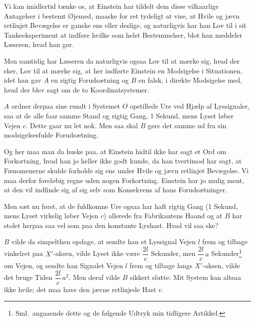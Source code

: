 \documentclass[12pt,a4paper]{article}
\newcommand{\opage}[1]{\marginnote{\footnotesize\textit{[#1]}}}
\begin{document}
Vi kan imidlertid tænke os, at Einstein har tildelt dem disse vilkaarlige
Antagelser i bestemt Øjemed, maaske for ret tydeligt at vise, at Hvile og jævn
retlinjet Bevægelse er ganske ens eller deslige, og naturligvis har han Lov til
i sit Tankeeksperiment at indføre hvilke som helst Bestemmelser, blot han
meddeler Læseren, hvad han gør.

Men samtidig har Læseren da naturligvis ogsaa Lov til at mærke sig, hvad der
sker, Lov til at mærke sig, at her indførte Einstein en Modsigelse i
Situationen, idet han gav $A$ en rigtig Forudsætning og $B$ en falsk, i direkte
Modsigelse med, hvad der blev sagt om de to Koordinatsystemer.

$A$ ordner derpaa sine rundt i Systemet $O$ opstillede Ure ved Hjælp af
Lyssignaler, saa at de alle faar samme Stand og rigtig Gang, 1 Sekund, mens
Lyset løber Vejen $c$. Dette gaar nu let nok. Men saa skal $B$ gøre det samme
ud fra sin modsigelsesfulde Forudsætning.

\opage{200} Og her maa man da huske paa, at Einstein hidtil ikke har sagt et Ord om
Forkortning, hvad han jo heller ikke godt kunde, da han tvertimod har sagt, at
Fænomenerne skulde forholde sig ens under Hvile og jævn retlinjet Bevægelse. Vi
maa derfor foreløbig regne uden nogen Forkortning. Einstein har jo mulig ment,
at den vil indfinde sig af sig selv som Konsekvens af hans Forudsætninger.

Men sæt nu først, at de \guillemotleft fuldkomne\guillemotright{} Ure ogsaa har
haft rigtig Gang (1 Sekund, mens Lyset virkelig løber Vejen $c$) allerede fra
Fabrikantens Haand og at $B$ har stolet herpaa saa vel som paa den konstante
Lyshast. Hvad vil saa ske?

$B$ vilde da simpelthen opdage, at sendte han et Lyssignal Vejen $l$ frem og
tilbage vinkelret paa $X'$-aksen, vilde Lyset ikke være $\dfrac{2l}{c}$
Sekunder, men $\dfrac{2l}{c}\,a$ Sekunder\footnote{Sml.\ angaaende dette og de
følgende Udtryk min tidligere Artikkel.} om Vejen, og sendte han Signalet Vejen
$l$ frem og tilbage langs $X'$-aksen, vilde det bruge Tiden
$\dfrac{2l}{c}\,a^{2}$. Men deraf vilde $B$ sikkert slutte: Mit System kan
altsaa ikke hvile; det maa have den jævne retlinjede Hast $v$.
\end{document}
